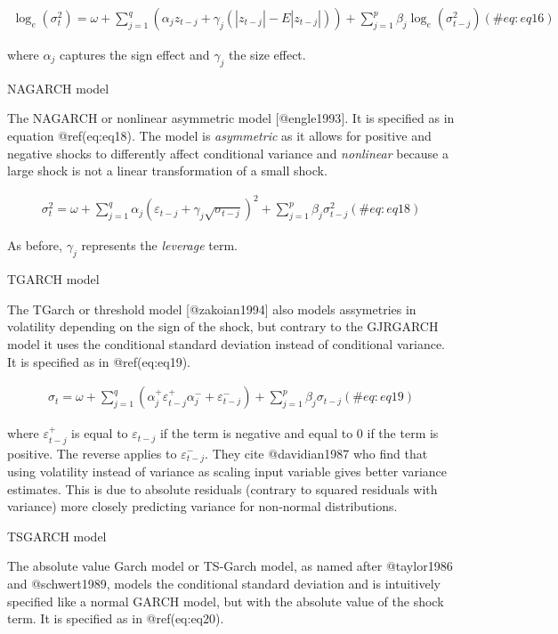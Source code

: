 \documentclass[
]{article}
\begin{document}
\begin{align}
\log_e(\sigma_t^2) = \omega + \sum\limits_{j=1}^q (\alpha_j z_{t-j} + \gamma_j (|z_{t-j}| - E|z_{t-j}|))+ \sum\limits_{j = 1}^p \beta_j \log_e(\sigma_{t-j}^2)
 (\#eq:eq16)
\end{align}

\noindent where \(\alpha_j\) captures the sign effect and \(\gamma_j\)
the size effect.

NAGARCH model

\noindent The NAGARCH or nonlinear asymmetric model {[}@engle1993{]}. It
is specified as in equation @ref(eq:eq18). The model is
\emph{asymmetric} as it allows for positive and negative shocks to
differently affect conditional variance and \emph{nonlinear} because a
large shock is not a linear transformation of a small shock.

\begin{align}
\sigma_t^2 = \omega + \sum\limits_{j=1}^q \alpha_j (\varepsilon_{t-j}+ \gamma_j \sqrt{\sigma_{t-j}})^2 + \sum\limits_{j = 1}^p \beta_j \sigma_{t-j}^2
 (\#eq:eq18)
\end{align}

As before, \(\gamma_j\) represents the \emph{leverage} term.

TGARCH model

\noindent The TGarch or threshold model {[}@zakoian1994{]} also models
assymetries in volatility depending on the sign of the shock, but
contrary to the GJRGARCH model it uses the conditional standard
deviation instead of conditional variance. It is specified as in
@ref(eq:eq19).

\begin{align}
\sigma_t = \omega + \sum\limits_{j=1}^q (\alpha_j^+ \varepsilon_{t-j}^+ \alpha_j^{-} + \varepsilon_{t-j}^{-}) + \sum\limits_{j = 1}^p \beta_j \sigma_{t-j}
 (\#eq:eq19)
\end{align}

\noindent where \(\varepsilon_{t-j}^+\) is equal to
\(\varepsilon_{t-j}\) if the term is negative and equal to 0 if the term
is positive. The reverse applies to \(\varepsilon_{t-j}^-\). They cite
@davidian1987 who find that using volatility instead of variance as
scaling input variable gives better variance estimates. This is due to
absolute residuals (contrary to squared residuals with variance) more
closely predicting variance for non-normal distributions.

TSGARCH model

\noindent The absolute value Garch model or TS-Garch model, as named
after @taylor1986 and @schwert1989, models the conditional standard
deviation and is intuitively specified like a normal GARCH model, but
with the absolute value of the shock term. It is specified as in
@ref(eq:eq20).
\end{document}
